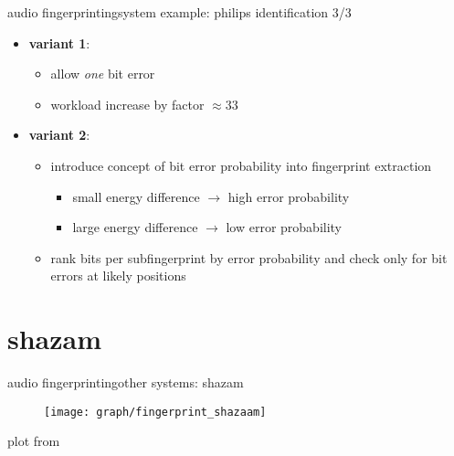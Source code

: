         \begin{frame}{audio fingerprinting}{system example: philips identification 3/3}
            \begin{itemize}
                \item \textbf{variant 1}: 
                    \begin{itemize}
                        \item	allow \textit{one} bit error  
                        \item<2->[$\Rightarrow$] workload increase by factor $\approx 33$
                     \end{itemize}
               \bigskip
                \item<3-> \textbf{variant 2}: 
                    \begin{itemize}
                        \item<3->	introduce concept of bit error probability into fingerprint extraction
                            \begin{itemize}
                                \item	small energy difference $\rightarrow$ high error probability
                                \item	large energy difference $\rightarrow$ low error probability
                            \end{itemize}
                        \bigskip
                        \item<4->	rank bits per subfingerprint by error probability and check only for bit errors at likely positions
                    \end{itemize}
            \end{itemize}
        \end{frame}

     \section{shazam}   
        \begin{frame}{audio fingerprinting}{other systems: shazam}
            \vspace{-3mm}
            \begin{figure}
                \centering
                \texttt{[image: graph/fingerprint\_shazaam]}
            \end{figure}
            \vspace{-5mm}
            plot from 
            
        \end{frame}
    
